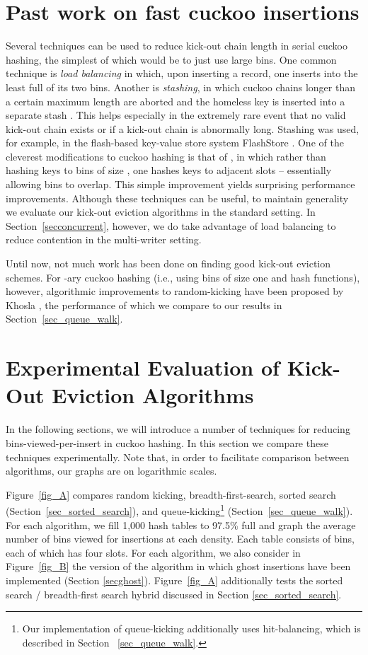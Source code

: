 \documentclass{sig-alternate-05-2015}
\begin{document}
\section{Past work on fast cuckoo insertions} \label{sec_past_work}

Several techniques can be used to reduce kick-out chain length in
serial cuckoo hashing, the simplest of which would be to just use
large bins. One common technique is \emph{load balancing} in which,
upon inserting a record, one inserts into the least full of its two
bins. Another is \emph{stashing}, in which cuckoo chains longer than a
certain maximum length are aborted and the homeless key is inserted
into a separate stash \cite{kirsch09}. This helps especially in the
extremely rare event that no valid kick-out chain exists or if a
kick-out chain is abnormally long. Stashing was used, for example, in
the flash-based key-value store system FlashStore \cite{flash10}. One
of the cleverest modifications to cuckoo hashing is that of
\cite{lehman09}, in which rather than hashing keys to bins of size
, one hashes keys to  adjacent slots -- essentially allowing
bins to overlap. This simple improvement yields surprising performance
improvements. Although these techniques can be useful, to maintain
generality we evaluate our kick-out eviction algorithms in the
standard setting. In Section~\ref{secconcurrent}, however, we do take
advantage of load balancing to reduce contention in the multi-writer
setting.


Until now, not much work has been done on finding good kick-out
eviction schemes.
For -ary cuckoo hashing (i.e., using bins of size one and  hash
functions), however, algorithmic improvements to random-kicking have
been proposed by Khosla \cite{khosla13}, the performance of which we
compare to our results in Section~\ref{sec_queue_walk}.

\section{Experimental Evaluation of Kick-Out Eviction Algorithms}\label{secexp}

In the following sections, we will introduce a number of techniques
for reducing bins-viewed-per-insert in cuckoo hashing. In this section
we compare these techniques experimentally. Note that, in order to
facilitate comparison between algorithms, our graphs are on
logarithmic scales.

Figure~\ref{fig_A} compares random kicking, breadth-first-search,
sorted search (Section~\ref{sec_sorted_search}), and
queue-kicking\footnote{Our implementation of queue-kicking
  additionally uses hit-balancing, which is described in Section
 ~\ref{sec_queue_walk}.} (Section~\ref{sec_queue_walk}). For each
algorithm, we fill 1,000 hash tables to 97.5\% full and graph the
average number of bins viewed for insertions at each density. Each
table consists of  bins, each of which has four slots. For
each algorithm, we also consider in Figure~\ref{fig_B} the version of
the algorithm in which ghost insertions have been implemented (Section
\ref{secghost}). Figure~\ref{fig_A} additionally tests the sorted
search / breadth-first search hybrid discussed in Section
\ref{sec_sorted_search}.
\end{document}
